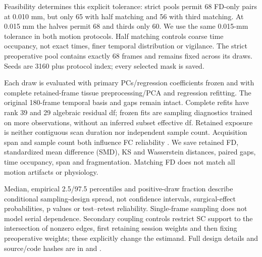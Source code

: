\documentclass[11pt,a4paper]{article}
\begin{document}
Feasibility determines this explicit tolerance: strict pools permit 68 FD-only pairs at 0.010 mm, but only 65 with half matching and 56 with third matching. At 0.015 mm the halves permit 68 and thirds only 60. We use the same 0.015-mm tolerance in both motion protocols. Half matching controls coarse time occupancy, not exact times, finer temporal distribution or vigilance. The strict preoperative pool contains exactly 68 frames and remains fixed across its draws. Seeds are 3160 plus protocol index; every selected mask is saved.

Each draw is evaluated with primary PCs/regression coefficients frozen and with complete retained-frame tissue preprocessing/PCA and regression refitting. The original 180-frame temporal basis and gaps remain intact. Complete refits have rank 39 and 29 algebraic residual df; frozen fits are sampling diagnostics trained on more observations, without an inferred subset effective df. Retained exposure is neither contiguous scan duration nor independent sample count. Acquisition span and sample count both influence FC reliability \citep{birn2013}. We save retained FD, standardized mean difference (SMD), KS and Wasserstein distances, paired gaps, time occupancy, span and fragmentation. Matching FD does not match all motion artifacts or physiology.

Median, empirical 2.5/97.5 percentiles and positive-draw fraction describe conditional sampling-design spread, not confidence intervals, surgical-effect probabilities, p values or test--retest reliability. Single-frame sampling does not model serial dependence. Secondary coupling controls restrict SC support to the intersection of nonzero edges, first retaining session weights and then fixing preoperative weights; these explicitly change the estimand. Full design details and source/code hashes are in  and .
\end{document}
